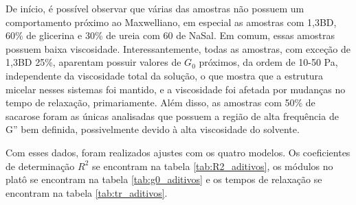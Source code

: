 	De início, é possível observar que várias das amostras não possuem um comportamento próximo ao Maxwelliano, em especial as amostras com 1,3BD, 60\% de glicerina e 30\% de ureia com 60 \mM{} de NaSal. Em comum, essas amostras possuem baixa viscosidade. Interessantemente, todas as amostras, com exceção de 1,3BD 25\%, aparentam possuir valores de \(G_0\) próximos, da ordem de 10-50 Pa, independente da viscosidade total da solução, o que mostra que a estrutura micelar nesses sistemas foi mantido, e a viscosidade foi afetada por mudanças no tempo de relaxação, primariamente. Além disso, as amostras com 50\% de sacarose foram as únicas analisadas que possuem a região de alta frequência de G'' bem definida, possivelmente devido à alta viscosidade do solvente.
	
	Com esses dados, foram realizados ajustes com os quatro modelos. Os coeficientes de determinação \(R^2\) se encontram na tabela \ref{tab:R2_aditivos}, os módulos no platô se encontram na tabela \ref{tab:g0_aditivos} e os tempos de relaxação se encontram na tabela \ref{tab:tr_aditivos}. 


